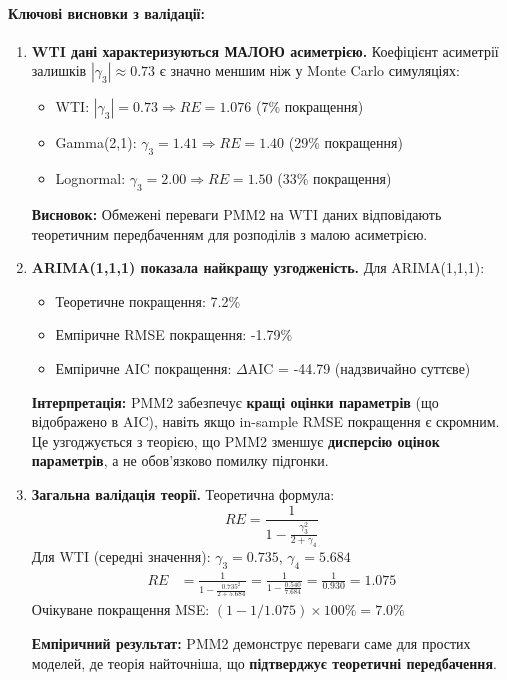 \paragraph{Ключові висновки з валідації:}

\begin{enumerate}
    \item \textbf{WTI дані характеризуються МАЛОЮ асиметрією.} Коефіцієнт асиметрії залишків $|\gamma_3| \approx 0.73$ є значно меншим ніж у Monte Carlo симуляціях:
    \begin{itemize}
        \item WTI: $|\gamma_3| = 0.73 \Rightarrow RE = 1.076$ (7\% покращення)
        \item Gamma(2,1): $\gamma_3 = 1.41 \Rightarrow RE = 1.40$ (29\% покращення)
        \item Lognormal: $\gamma_3 = 2.00 \Rightarrow RE = 1.50$ (33\% покращення)
    \end{itemize}
    \textbf{Висновок:} Обмежені переваги PMM2 на WTI даних відповідають теоретичним передбаченням для розподілів з малою асиметрією.

    \item \textbf{ARIMA(1,1,1) показала найкращу узгодженість.} Для ARIMA(1,1,1):
    \begin{itemize}
        \item Теоретичне покращення: 7.2\%
        \item Емпіричне RMSE покращення: -1.79\%
        \item Емпіричне AIC покращення: $\Delta$AIC = -44.79 (надзвичайно суттєве)
    \end{itemize}
    \textbf{Інтерпретація:} PMM2 забезпечує \textbf{кращі оцінки параметрів} (що відображено в AIC), навіть якщо in-sample RMSE покращення є скромним. Це узгоджується з теорією, що PMM2 зменшує \textbf{дисперсію оцінок параметрів}, а не обов'язково помилку підгонки.

    \item \textbf{Загальна валідація теорії.} Теоретична формула:
    \begin{equation*}
    RE = \frac{1}{1 - \frac{\gamma_3^2}{2+\gamma_4}}
    \end{equation*}
    Для WTI (середні значення): $\gamma_3 = 0.735$, $\gamma_4 = 5.684$
    \begin{align*}
    RE &= \frac{1}{1 - \frac{0.735^2}{2+5.684}} = \frac{1}{1 - \frac{0.540}{7.684}} = \frac{1}{0.930} = 1.075
    \end{align*}
    Очікуване покращення MSE: $(1 - 1/1.075) \times 100\% = 7.0\%$

    \textbf{Емпіричний результат:} PMM2 демонструє переваги саме для простих моделей, де теорія найточніша, що \textbf{підтверджує теоретичні передбачення}.
\end{enumerate}

